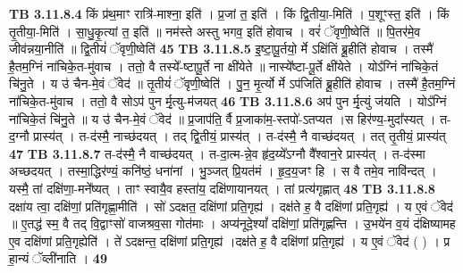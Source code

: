 \documentclass[17pt]{extarticle}
\begin{document}
{{{{{{{{{{{{{{{{{{{{{{                  \newline
                                \textbf{ TB 3.11.8.4} \newline
                  किं प्र॑थ॒माꣳ रात्रि॑-माश्ना॒ इति॑ । प्र॒जां त॒ इति॑ । किं द्वि॒तीया॒-मिति॑ । प॒शूꣳस्त॒ इति॑ । किं तृ॒तीया॒-मिति॑ । सा॒धु॒कृ॒त्यां त॒ इति॑ ॥ नम॑स्ते अस्तु भगव॒ इति॑ होवाच । वरं॑ ॅवृणी॒ष्वेति॑ ॥ पि॒तर॑मे॒व जीव॑न्नया॒नीति॑ ॥ द्वि॒तीयं॑ ॅवृणी॒ष्वेति॑ \textbf{ 45} \newline
                  \newline
                                \textbf{ TB 3.11.8.5} \newline
                  इ॒ष्टा॒पू॒र्तयो॒ र्मे ऽक्षि॑तिं ब्रू॒हीति॑ होवाच । तस्मै॑ है॒तम॒ग्निं ना॑चिके॒त-मु॑वाच । ततो॒ वै तस्ये᳚-ष्टापू॒र्ते ना क्षी॑येते ॥ नास्ये᳚ष्टा-पू॒र्ते क्षी॑येते । योऽ᳚ग्निं ना॑चिके॒तं चि॑नु॒ते । य उ॑ चैन-मे॒वं ॅवेद॑ ॥ तृ॒तीयं॑ ॅवृणी॒ष्वेति॑ । पु॒न॒ मृ॒र्त्यो र्मे ऽप॑जितिं ब्रू॒हीति॑ होवाच । तस्मै॑ है॒तम॒ग्निं ना॑चिके॒त-मु॑वाच । ततो॒ वै सोऽप॑ पुन र्मृ॒त्यु-म॑जयत् \textbf{ 46} \newline
                  \newline
                                \textbf{ TB 3.11.8.6} \newline
                  अप॑ पुन र्मृ॒त्युं ज॑यति । योऽ᳚ग्निं ना॑चिके॒तं चि॑नु॒ते ॥ य उ॑ चैन-मे॒वं ॅवेद॑ ॥ प्र॒जाप॑ति॒ र्वै प्र॒जाका॑म॒-स्तपो॑-ऽतप्यत ।स हिर॑ण्य॒-मुदा᳚स्यत् । त-द॒ग्नौ प्रास्य॑त् । त-द॑स्मै॒ नाच्छ॑दयत् । तद् द्वि॒तीयं॒ प्रास्य॑त् । त-द॑स्मै॒ नै वाच्छ॑दयत् । तत् तृ॒तीयं॒ प्रास्य॑त् \textbf{ 47} \newline
                  \newline
                                \textbf{ TB 3.11.8.7} \newline
                  त-द॑स्मै॒ नै वाच्छ॑दयत् । त-दा॒त्म-न्ने॒व हृ॑द॒य्ये᳚ऽग्नौ वै᳚श्वान॒रे प्रास्य॑त् । त-द॑स्मा अच्छदयत् । तस्मा॒द्धिर॑ण्यं॒ कनि॑ष्ठं॒ धना॑नां । भु॒ञ्जत् प्रि॒यत॑मं । हृ॒द॒य॒जꣳ हि । स वै तमे॒व नावि॑न्दत् । यस्मै॒ तां दक्षि॑णा॒-मने᳚ष्यत् । ताꣳ स्वायै॒व हस्ता॑य॒ दक्षि॑णायानयत् । तां प्रत्य॑गृह्णात् \textbf{ 48} \newline
                  \newline
                                \textbf{ TB 3.11.8.8} \newline
                  दक्षा॑य त्वा॒ दक्षि॑णां॒ प्रति॑गृह्णा॒मीति॑ । सो॑ ऽदक्षत॒ दक्षि॑णां प्रति॒गृह्य॑ । दक्ष॑ते ह॒ वै दक्षि॑णां प्रति॒गृह्य॑ । य ए॒वं ॅवेद॑ ॥ ए॒तद्ध॑ स्म॒ वै तद् वि॒द्वाꣳसो॑ वाजश्रव॒सा गोत॑माः । अप्य॑नूदे॒श्यां᳚ दक्षि॑णां॒ प्रति॑गृह्णन्ति । उ॒भये॑न व॒यं द॑क्षिष्यामह ए॒व दक्षि॑णां प्रति॒गृह्येति॑ । ते॑ ऽदक्षन्त॒ दक्षि॑णां प्रति॒गृह्य॑ ।दक्ष॑ते ह॒ वै दक्षि॑णां प्रति॒गृह्य॑ । य ए॒वं ॅवेद॑ ( ) । प्र हा॒न्यं ॅव्ली॑नाति । \textbf{ 49} \newline
}}}}}}}}}}}}}}}}}}}}}}
\end{document}

